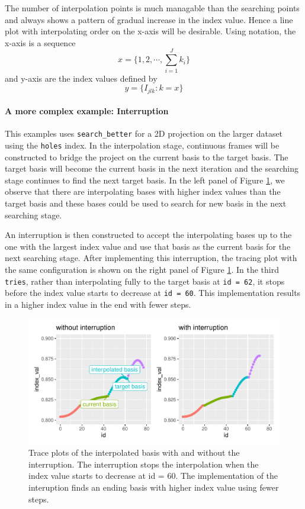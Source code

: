 \documentclass[12pt]{article}
\begin{document}
\newpage

The number of interpolation points is much managable than the searching
points and always shows a pattern of gradual increase in the index
value. Hence a line plot with interpolating order on the x-axis will be
desirable. Using notation, the x-axis is a sequence
\[x = \{1, 2, \cdots,\sum_{i=1}^Jk_i\}\] and y-axis are the index values
defined by \[y = \{I_{jlk}: k = x\}\]

\hypertarget{a-more-complex-example-interruption}{%
\paragraph{A more complex example:
Interruption}\label{a-more-complex-example-interruption}}

This examples uses \texttt{search\_better} for a 2D projection on the
larger dataset using the \texttt{holes} index. In the interpolation
stage, continuous frames will be constructed to bridge the project on
the current basis to the target basis. The target basis will become the
current basis in the next iteration and the searching stage continues to
find the next target basis. In the left panel of Figure
\ref{interruption}, we observe that there are interpolating bases with
higher index values than the target basis and these bases could be used
to search for new basis in the next searching stage.

An interruption is then constructed to accept the interpolating bases up
to the one with the largest index value and use that basis as the
current basis for the next searching stage. After implementing this
interruption, the tracing plot with the same configuration is shown on
the right panel of Figure \ref{interruption}. In the third
\texttt{tries}, rather than interpolating fully to the target basis at
\texttt{id\ =\ 62}, it stops before the index value starts to decrease
at \texttt{id\ =\ 60}. This implementation results in a higher index
value in the end with fewer steps.

\begin{figure}
\centering
\includegraphics{paper_files/figure-latex/interruption-1.pdf}
\caption{\label{interruption}Trace plots of the interpolated basis with
and without the interruption. The interruption stops the interpolation
when the index value starts to decrease at id = 60. The implementation
of the interuption finds an ending basis with higher index value using
fewer steps.}
\end{figure}
\end{document}
